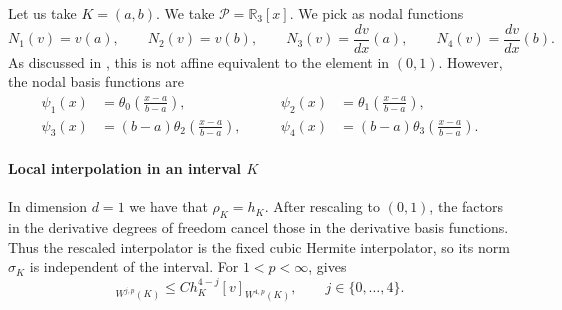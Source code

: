Let us take $K = (a,b)$.
We take $\mathcal P = \mathbb R_3[x]$.
We pick as nodal functions
\begin{equation*}
    N_1 (v) = v(a), \qquad N_2(v) = v(b), \qquad N_3(v) = \frac{dv}{dx} (a), \qquad N_4(v) = \frac{dv}{dx} (b).
\end{equation*}
As discussed in , this is not affine equivalent to the element in $(0,1)$. However, the nodal basis functions are
\begin{equation*}
    \begin{aligned}
        \psi_1(x) & = \theta_0 (\tfrac{x-a}{b-a}),       & \qquad \psi_2(x) & = \theta_1 (\tfrac{x-a}{b-a}),       \\
        \psi_3(x) & = (b-a) \theta_2 (\tfrac{x-a}{b-a}), & \qquad \psi_4(x) & = (b-a) \theta_3 (\tfrac{x-a}{b-a}).
    \end{aligned}
\end{equation*}

\paragraph{Local interpolation in an interval $K$}
In dimension $d=1$ we have that $\rho_K = h_K$.
After rescaling to $(0,1)$, the factors in the derivative degrees of freedom cancel those in the derivative basis functions. Thus the rescaled interpolator is the fixed cubic Hermite interpolator, so its norm $\sigma_K$ is independent of the interval. For $1<p<\infty$,  gives
\begin{equation*}
    [v - \mathcal I_K v]_{W^{j,p} (K)} \le C h_K^{4-j}[v]_{W^{4,p}(K)}, \qquad j \in \{0, \dots, 4\}.
\end{equation*}


